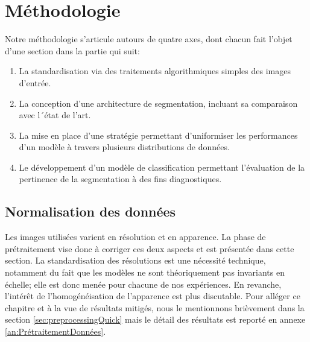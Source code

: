 \section{Méthodologie}
Notre méthodologie s'articule autours de quatre axes, dont chacun fait l'objet d'une section dans la partie qui suit:
\begin{enumerate}
	\item La standardisation via des traitements algorithmiques simples des images d'entrée.
	\item La conception d'une architecture de segmentation, incluant sa comparaison avec l´état de l'art.
	\item La mise en place d'une stratégie permettant d'uniformiser les performances d'un modèle à travers plusieurs distributions de données.
	\item Le développement d'un modèle de classification permettant l'évaluation de la pertinence de la segmentation à des fins diagnostiques.
\end{enumerate}
\subsection{Normalisation des données}
Les images utilisées varient en résolution et en apparence. La phase de prétraitement vise donc à corriger ces deux aspects et est présentée dans cette section. La standardisation des résolutions est une nécessité technique, notamment du fait que les modèles ne sont théoriquement pas invariants en échelle; elle est donc menée pour chacune de nos expériences. En revanche, l'intérêt de l'homogénéisation de l'apparence est plus discutable. Pour alléger ce chapitre et à la vue de résultats mitigés, nous le mentionnons brièvement dans la section \ref{sec:preprocessingQuick} mais le détail des résultats est reporté en annexe \ref{an:PrétraitementDonnées}.
